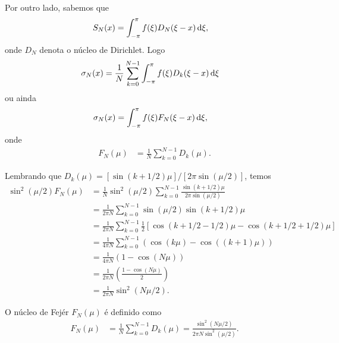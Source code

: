 \begin{obs}
    Por outro lado, sabemos que
    \begin{align*}
        S_N(x) &= \int_{-\pi}^\pi f(\xi) D_N(\xi - x) \, \mathrm{d}\xi,
    \end{align*}
    onde $D_N$ denota o n\'{u}cleo de Dirichlet. Logo
    \begin{align*}
        \sigma_N(x) &= \frac{1}{N} \sum_{k = 0}^{N - 1} \int_{-\pi}^\pi f(\xi) D_k(\xi - x) \, \mathrm{d}\xi
    \end{align*}
    ou ainda
    \begin{align*}
        \sigma_N(x) &= \int_{-\pi}^\pi f(\xi) F_N(\xi - x) \, \mathrm{d}\xi,
    \end{align*}
    onde
    \begin{align*}
        F_N(\mu) &= \frac{1}{N} \sum_{k = 0}^{N - 1} D_k(\mu).
    \end{align*}

    Lembrando que $D_k(\mu) = \left[ \sin\left( k + 1/2 \right) \mu \right] / \left[ 2 \pi \sin\left( \mu/2 \right) \right]$, temos
    \begin{align*}
        \sin^2\left( \mu/2 \right) F_N(\mu) &= \frac{1}{N} \sin^2\left( \mu/2 \right) \sum_{k = 0}^{N - 1} \frac{\sin\left( k + 1/2 \right) \mu}{2 \pi \sin\left( \mu/2 \right)} \\
        &= \frac{1}{2 \pi N} \sum_{k = 0}^{N - 1} \sin\left( \mu/2 \right) \sin\left( k + 1/2 \right) \mu \\
        &= \frac{1}{2 \pi N} \sum_{k = 0}^{N - 1} \frac{1}{2} \left[ \cos\left( k + 1/2 - 1/2 \right) \mu - \cos\left( k + 1/2 + 1/2 \right) \mu \right] \\
        &= \frac{1}{4 \pi N} \sum_{k = 0}^{N - 1} \left( \cos\left( k \mu \right) - \cos\left( \left( k + 1 \right) \mu \right) \right) \\
        &= \frac{1}{4 \pi N} \left( 1 - \cos\left( N \mu \right) \right) \\
        &= \frac{1}{2 \pi N} \left( \frac{1 - \cos\left( N \mu \right)}{2} \right) \\
        &= \frac{1}{2 \pi N} \sin^2\left( N \mu / 2 \right).
    \end{align*}
\end{obs}
\begin{defi}
    O n\'{u}cleo de Fej\'{e}r $F_N(\mu)$ \'{e} definido como
    \begin{align*}
        F_N(\mu) &= \frac{1}{N} \sum_{k = 0}^{N - 1} D_k(\mu) = \frac{\sin^2\left( N \mu / 2 \right)}{2 \pi N \sin^2\left( \mu/2 \right)}.
    \end{align*}
\end{defi}

